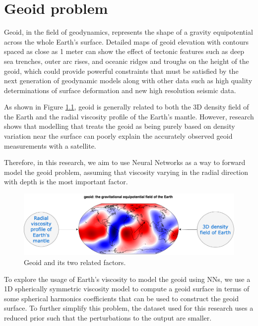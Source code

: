 \chapter{Geoid problem}\label{chap:content}

Geoid, in the field of geodynamics, represents the shape of a gravity equipotential across the whole Earth's surface. Detailed maps of geoid elevation with contours spaced as close as 1 meter can show the effect of tectonic features such as deep sea trenches, outer arc rises, and oceanic ridges and troughs on the height of the geoid, which could provide powerful constraints that must be satisfied by the next generation of geodynamic models along with other data such as high quality determinations of surface deformation and new high resolution seismic data. \citep{10.1038_299104a0}

As shown in Figure \ref{figure:geoid_factors}, geoid is generally related to both the 3D density field of the Earth and the radial viscosity profile of the Earth's mantle. However, research shows that modelling that treats the geoid as being purely based on density variation near the surface can poorly explain the accurately observed geoid measurements with a satellite. \citep{10.1098_rsta.1989.0038}

Therefore, in this research, we aim to use Neural Networks as a way to forward model the geoid problem,
assuming that viscosity varying in the radial direction with depth is the most important factor.

\begin{figure}[H]
    \centering
    \includegraphics[scale=0.4]{figures/geoid_images/Geoid.png}
    \caption{Geoid and its two related factors.}
    \label{figure:geoid_factors}
\end{figure}

To explore the usage of Earth's viscosity to model the geoid using NNs, we use a 1D spherically symmetric viscosity model to compute a geoid surface in terms of some spherical harmonics coefficients that can be used to construct the geoid surface. To further simplify this problem, the dataset used for this research uses a reduced prior such that the perturbations to the output are smaller.


